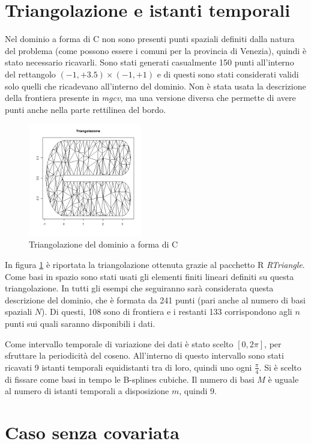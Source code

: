 \documentclass[a4paper,11pt,twoside,openright]{book}							%
\begin{document}
\section{Triangolazione e istanti temporali}
Nel dominio a forma di C non sono presenti punti spaziali definiti dalla natura del problema (come possono essere i comuni per la provincia di Venezia), quindi è stato necessario ricavarli. Sono stati generati casualmente 150 punti all'interno del rettangolo $(-1,+3.5) \times (-1,+1)$ e di questi sono stati considerati validi solo quelli che ricadevano all'interno del dominio. Non è stata usata la descrizione della frontiera presente in \textit{mgcv}, ma una versione diversa che permette di avere punti anche nella parte rettilinea del bordo.
\begin{figure}[t]
	\centering
	\includegraphics[width=0.44\textwidth]{Immagini/DomCinizio/DomC_Triangolazione.png}
	\caption{Triangolazione del dominio a forma di C}
	\label{fig:domC_triang}
\end{figure}
In figura \ref{fig:domC_triang} è riportata la triangolazione ottenuta grazie al pacchetto R \textit{RTriangle}. Come basi in spazio sono stati usati gli elementi finiti lineari definiti su questa triangolazione. In tutti gli esempi che seguiranno sarà considerata questa descrizione del dominio, che è formata da 241 punti (pari anche al numero di basi spaziali $N$). Di questi, 108 sono di frontiera e i restanti 133 corrispondono agli $n$ punti sui quali saranno disponibili i dati.

Come intervallo temporale di variazione dei dati è stato scelto $[0,2\pi]$, per sfruttare la periodicità del coseno. All'interno di questo intervallo sono stati ricavati 9 istanti temporali equidistanti tra di loro, quindi uno ogni $\frac{\pi}{4}$. Si è scelto di fissare come basi in tempo le B-splines cubiche. Il numero di basi $M$ è uguale al numero di istanti temporali a disposizione $m$, quindi 9. 

\section{Caso senza covariata}
\end{document}
